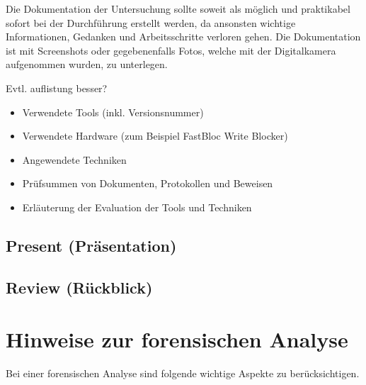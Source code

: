 Die Dokumentation der Untersuchung sollte soweit als möglich und praktikabel sofort bei der Durchführung erstellt werden, da ansonsten wichtige Informationen, Gedanken und Arbeitsschritte verloren gehen. Die Dokumentation ist mit Screenshots oder gegebenenfalls Fotos, welche mit der Digitalkamera aufgenommen wurden, zu unterlegen.

Evtl. auflistung besser?
\begin{itemize}
\item Verwendete Tools (inkl. Versionsnummer)
\item Verwendete Hardware (zum Beispiel FastBloc Write Blocker)
\item Angewendete Techniken
\item Prüfsummen von Dokumenten, Protokollen und Beweisen
\item Erläuterung der Evaluation der Tools und Techniken
\end{itemize}


\subsection{Present (Präsentation)}


\subsection{Review (Rückblick)}

\section{Hinweise zur forensischen Analyse}
Bei einer forensischen Analyse sind folgende wichtige Aspekte zu berücksichtigen.

